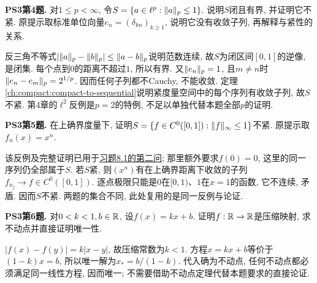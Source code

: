 \begin{exercise}\label{ps190:3:4}
\textbf{PS3第4题.} 对$1\le p<\infty$, 令$S=\{a\in\ell^p:\lVert a\rVert_p\le1\}$. 说明$S$闭且有界, 并证明它不紧. 原提示取标准单位向量$e_n=(\delta_{kn})_{k\ge1}$, 说明它没有收敛子列, 再解释与紧性的关系.
\end{exercise}
\begin{solution}
反三角不等式$|\lVert a\rVert_p-\lVert b\rVert_p|\le\lVert a-b\rVert_p$说明范数连续, 故$S$为闭区间$[0,1]$的逆像, 是闭集. 每个点到$0$的距离不超过$1$, 所以有界. 又$\lVert e_n\rVert_p=1$, 且$m\ne n$时$\lVert e_n-e_m\rVert_p=2^{1/p}$. 因而任何子列都不Cauchy, 不能收敛. 定理\ref{ch:compact:compact-to-sequential}说明紧度量空间中的每个序列有收敛子列, 故$S$不紧. 第4章的$\ell^2$反例是$p=2$的特例, 不足以单独代替本题全部$p$的证明.
\end{solution}

\begin{exercise}\label{ps190:3:5}
\textbf{PS3第5题.} 在上确界度量下, 证明$S=\{f\in C^0([0,1]):\lVert f\rVert_\infty\le1\}$不紧. 原提示取$f_n(x)=x^n$.
\end{exercise}
\begin{solution}
该反例及完整证明已用于\hyperlink{exercise.8.1}{习题8.1的第二问}; 那里额外要求$f(0)=0$, 这里的同一序列仍全部属于$S$. 若$S$紧, 则$(x^n)$有在上确界距离下收敛的子列$f_{n_j}\to f\in C^0([0,1])$. 逐点极限只能是$0$在$[0,1)$、$1$在$x=1$的函数, 它不连续, 矛盾. 因而$S$不紧. 两题的集合不同, 此处复用的是同一反例与论证.
\end{solution}

\begin{exercise}\label{ps190:3:6}
\textbf{PS3第6题.} 对$0<k<1,b\in\mathbb R$, 设$f(x)=kx+b$. 证明$f:\mathbb R\to\mathbb R$是压缩映射, 求不动点并直接证明唯一性.
\end{exercise}
\begin{solution}
$|f(x)-f(y)|=k|x-y|$, 故压缩常数为$k<1$. 方程$x=kx+b$等价于$(1-k)x=b$, 所以唯一解为$x_*=b/(1-k)$. 代入确为不动点, 任何不动点都必须满足同一线性方程, 因而唯一; 不需要借助不动点定理代替本题要求的直接论证.
\end{solution}

